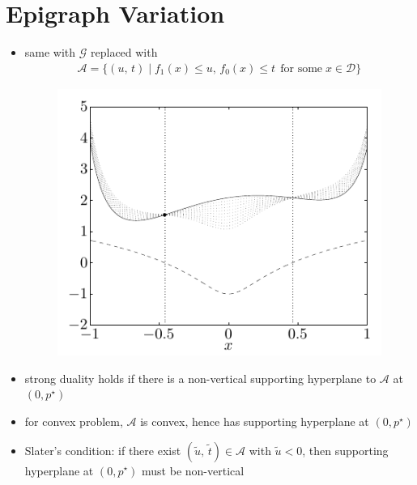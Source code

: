 \documentclass[11pt]{extarticle}
\newcommand{\ds}{\displaystyle}
\theoremstyle{definition}
\begin{document}
\newpage

\section*{Epigraph Variation}

\begin{itemize}\setlength\itemsep{0em}
  \item same with $\ds\mathcal{G}$ replaced with 
    \begin{align*}
      \mathcal{A} = \{(u,\,t)\;|\; f_1(x)\leqslant u,\,f_0(x)\leqslant t\;\,\text{for some}\;x\in\mathcal{D}\}
    \end{align*}
    \vspace{-2em}
    \begin{figure}[!htbp]
      \centering
      \includegraphics[scale=0.6,page=5]{fig/05.pdf}
    \end{figure}
    \vspace{-2em}
  \item strong duality holds if there is a non-vertical supporting hyperplane to $\mathcal{A}$ at $\ds (0, p^\star)$
  \item for convex problem, $\mathcal{A}$ is convex, hence has supporting hyperplane at $\ds (0, p^\star)$
  \item Slater's condition: if there exist $\ds(\widetilde{u},\,\widetilde{t})\in\mathcal{A}$ with $\ds\widetilde{u} < 0$, then supporting hyperplane at $\ds(0, p^\star)$ must be non-vertical
\end{itemize}

\newpage
\end{document}
